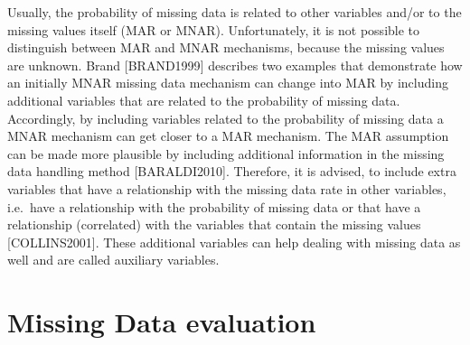 \documentclass[]{book}
\begin{document}
Usually, the probability of missing data is related to other variables
and/or to the missing values itself (MAR or MNAR). Unfortunately, it is
not possible to distinguish between MAR and MNAR mechanisms, because the
missing values are unknown. Brand {[}BRAND1999{]} describes two examples
that demonstrate how an initially MNAR missing data mechanism can change
into MAR by including additional variables that are related to the
probability of missing data. Accordingly, by including variables related
to the probability of missing data a MNAR mechanism can get closer to a
MAR mechanism. The MAR assumption can be made more plausible by
including additional information in the missing data handling method
{[}BARALDI2010{]}. Therefore, it is advised, to include extra variables
that have a relationship with the missing data rate in other variables,
i.e.~have a relationship with the probability of missing data or that
have a relationship (correlated) with the variables that contain the
missing values {[}COLLINS2001{]}. These additional variables can help
dealing with missing data as well and are called auxiliary variables.

\section{Missing Data evaluation}\label{missing-data-evaluation-1}
\end{document}
